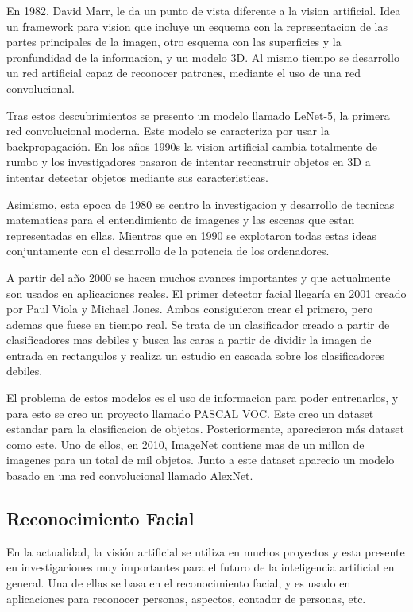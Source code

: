 En 1982, David Marr, le da un punto de vista diferente a la vision artificial. Idea un framework para vision que incluye un esquema con la representacion de las partes principales de la imagen, otro esquema con las superficies y la pronfundidad de la informacion, y un modelo 3D. Al mismo tiempo se desarrollo un red artificial capaz de reconocer patrones, mediante el uso de una red convolucional.

Tras estos descubrimientos se presento un modelo llamado LeNet-5, la primera red convolucional moderna. Este modelo se caracteriza por usar la backpropagación. En los años 1990s la vision artificial cambia totalmente de rumbo y los investigadores pasaron de intentar reconstruir objetos en 3D a intentar detectar objetos mediante sus caracteristicas.

Asimismo, esta epoca de 1980 se centro la investigacion y desarrollo de tecnicas matematicas para el entendimiento de imagenes y las escenas que estan representadas en ellas. Mientras que en 1990 se explotaron todas estas ideas conjuntamente con el desarrollo de la potencia de los ordenadores.

A partir del año 2000 se hacen muchos avances importantes y que actualmente son usados en aplicaciones reales. El primer detector facial llegaría en 2001 creado por Paul Viola y Michael Jones. Ambos consiguieron crear el primero, pero ademas que fuese en tiempo real. Se trata de un clasificador creado a partir de clasificadores mas debiles y busca las caras a partir de dividir la imagen de entrada en rectangulos y realiza un estudio en cascada sobre los clasificadores debiles.

El problema de estos modelos es el uso de informacion para poder entrenarlos, y para esto se creo un proyecto llamado PASCAL VOC. Este creo un dataset estandar para la clasificacion de objetos. Posteriormente, aparecieron más dataset como este. Uno de ellos, en 2010, ImageNet contiene mas de un millon de imagenes para un total de mil objetos. Junto a este dataset aparecio un modelo basado en una red convolucional llamado AlexNet.

\subsection{Reconocimiento Facial}

En la actualidad, la visión artificial se utiliza en muchos proyectos y esta presente en investigaciones muy importantes para el futuro de la inteligencia artificial en general. Una de ellas se basa en el reconocimiento facial, y es usado en aplicaciones para reconocer personas, aspectos, contador de personas, etc. 

